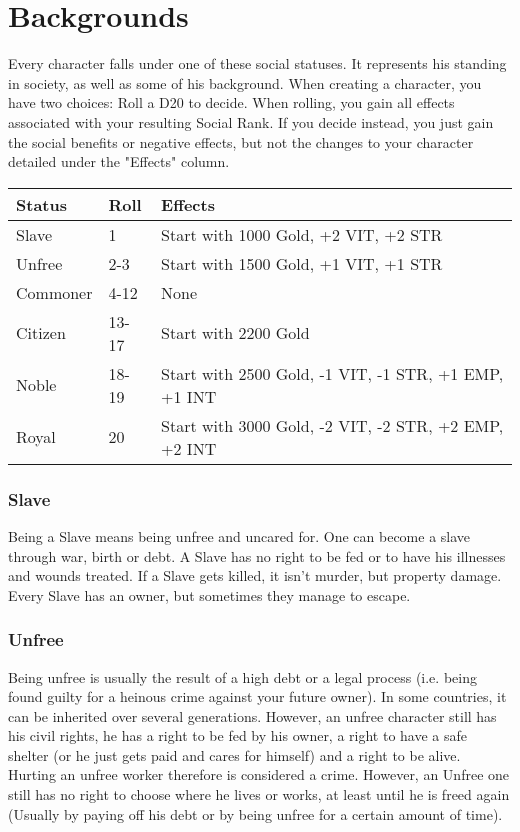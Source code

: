 \chapter{Backgrounds}
Every character falls under one of these social statuses. It represents his standing in society, as well as some of his background. When creating a character, you have two choices: Roll a D20 to decide. When rolling, you gain all effects associated with your resulting Social Rank. If you decide instead, you just gain the social benefits or negative effects, but not the changes to your character detailed under the "Effects" column.\\

\begin{tabular}{l | l | p{7.5cm}}
	Status & Roll & Effects\\ \hline
	Slave & 1 & Start with 1000 Gold, +2 VIT, +2 STR\\
	Unfree & 2-3 & Start with 1500 Gold, +1 VIT, +1 STR\\
	Commoner & 4-12 & None\\
	Citizen & 13-17 & Start with 2200 Gold\\
	Noble & 18-19 & Start with 2500 Gold, -1 VIT, -1 STR, +1 EMP, +1 INT\\
	Royal & 20 & Start with 3000 Gold, -2 VIT, -2 STR, +2 EMP, +2 INT
\end{tabular}

\subsection{Slave}

Being a Slave means being unfree and uncared for. One can become a slave through war, birth or debt. A Slave has no right to be fed or to have his illnesses and wounds treated. If a Slave gets killed, it isn’t murder, but property damage. Every Slave has an owner, but sometimes they manage to escape. 

\subsection{Unfree}

Being unfree is usually the result of a high debt or a legal process (i.e. being found guilty for a heinous crime against your future owner). In some countries, it can be inherited over several generations. However, an unfree character still has his civil rights, he has a right to be fed by his owner, a right to have a safe shelter (or he just gets paid and cares for himself) and a right to be alive. Hurting an unfree worker therefore is considered a crime. However, an Unfree one still has no right to choose where he lives or works, at least until he is freed again (Usually by paying off his debt or by being unfree for a certain amount of time).

